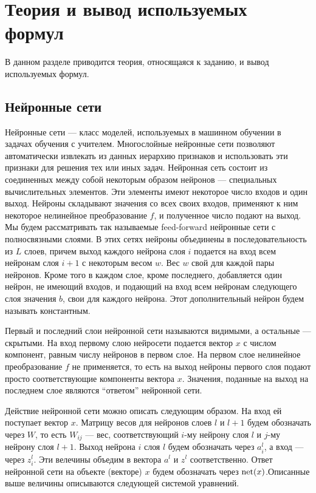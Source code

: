 \documentclass[12pt]{article}
\begin{document}
\section{Теория и вывод используемых формул}
	\hspace{0.6cm}В данном разделе приводится теория, относящаяся к заданию, и вывод используемых формул.

	\subsection{Нейронные сети}
		\hspace{0.6cm}Нейронные сети — класс моделей, используемых в машинном обучении в задачах обучения с учителем. Многослойные нейронные сети позволяют автоматически извлекать из данных иерархию признаков и использовать эти признаки для решения тех или иных задач. Нейронная сеть состоит из соединенных между собой некоторым образом нейронов — специальных вычислительных элементов. Эти элементы имеют некоторое число входов и один выход. Нейроны складывают значения со всех своих входов, применяют к ним некоторое нелинейное преобразование $f$, и полученное число подают на выход. Мы будем рассматривать так называемые feed-forward нейронные сети с полносвязными слоями. В этих сетях нейроны объединены в последовательность из $L$ слоев, причем выход каждого нейрона слоя $i$ подается на вход всем нейронам слоя $i+1$ с некоторым весом $w$. Вес $w$ свой для каждой пары нейронов. Кроме того в каждом слое, кроме последнего, добавляется один нейрон, не имеющий входов, и подающий на вход всем нейронам следующего слоя значения $b$, свои для каждого нейрона. Этот дополнительный нейрон будем называть константным.

		Первый и последний слои нейронной сети называются видимыми, а остальные — скрытыми. На вход первому слою нейросети подается вектор $x$ с числом компонент, равным числу нейронов в первом слое. На первом слое нелинейное преобразование $f$ не применяется, то есть на выход нейроны первого слоя подают просто соответствующие компоненты вектора $x$. Значения, поданные на выход на последнем слое являются ``ответом'' нейронной сети. 

		Действие нейронной сети можно описать следующим образом. На вход ей поступает вектор $x$. Матрицу весов для нейронов слоев $l$ и $l+1$ будем обозначать через $W$, то есть $W_{ij}$ — вес, соответствующий $i$-му нейрону слоя $l$ и $j$-му нейрону слоя $l+1$. Выход нейрона $i$ слоя $l$ будем обозначать через $a^l_i$, а вход — через $z^l_i$. Эти велечины объедим в вектора $a^l$ и $z^l$ соответственно. Ответ нейронной сети на объекте (векторе) $x$ будем обозначать через $\mbox{net}(x)$.Описанные выше величины описываются следующей системой уравнений.
		
\end{document}
